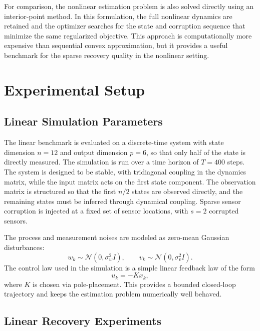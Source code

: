 \documentclass[conference]{IEEEtran}
\begin{document}
For comparison, the nonlinear estimation problem is also solved directly using an interior-point method. In this formulation, the full nonlinear dynamics are retained and the optimizer searches for the state and corruption sequence that minimize the same regularized objective. This approach is computationally more expensive than sequential convex approximation, but it provides a useful benchmark for the sparse recovery quality in the nonlinear setting. %


\section{Experimental Setup}

\subsection{Linear Simulation Parameters}

The linear benchmark is evaluated on a discrete-time system with state dimension $n=12$ and output dimension $p=6$, so that only half of the state is directly measured. The simulation is run over a time horizon of $T=400$ steps. The system is designed to be stable, with tridiagonal coupling in the dynamics matrix, while the input matrix acts on the first state component. The observation matrix is structured so that the first $n/2$ states are observed directly, and the remaining states must be inferred through dynamical coupling. Sparse sensor corruption is injected at a fixed set of sensor locations, with $s=2$ corrupted sensors. %

The process and measurement noises are modeled as zero-mean Gaussian disturbances:
\begin{equation}
w_k \sim \mathcal{N}(0,\sigma_w^2 I), \qquad v_k \sim \mathcal{N}(0,\sigma_v^2 I).
\end{equation}
The control law used in the simulation is a simple linear feedback law of the form
\begin{equation}
u_k = -Kx_k,
\end{equation}
where \(K\) is chosen via pole-placement. This provides a bounded closed-loop trajectory and keeps the estimation problem numerically well behaved. %


\subsection{Linear Recovery Experiments}
\end{document}
